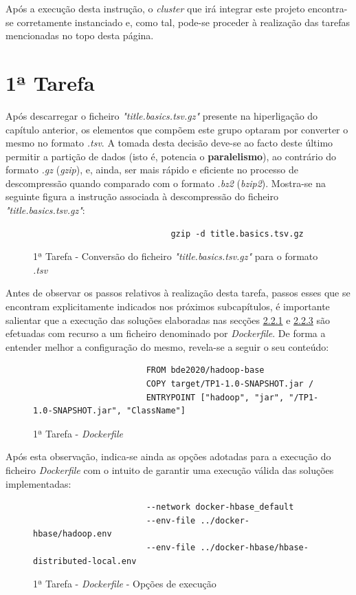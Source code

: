 \documentclass[a4paper]{report}
\begin{document}
{		Após a execução desta instrução, o \textit{cluster} que irá integrar este projeto encontra-se corretamente instanciado e, como tal, pode-se proceder à realização das tarefas mencionadas no topo desta página.
	
	\section{1ª Tarefa} \label{sec:Task1}
		Após descarregar o ficheiro \textit{"title.basics.tsv.gz"} presente na hiperligação do capítulo anterior, os elementos que compõem este grupo optaram por converter o mesmo no formato \textit{.tsv}. 
		A tomada desta decisão deve-se ao facto deste último permitir a partição de dados (isto é, potencia o \textbf{paralelismo}), ao contrário do formato \textit{.gz} (\textit{gzip}), e, ainda, ser mais rápido e eficiente no processo de descompressão quando comparado com o formato \textit{.bz2} (\textit{bzip2}).
		Mostra-se na seguinte figura a instrução associada à descompressão do ficheiro \textit{"title.basics.tsv.gz"}:
		\begin{figure}[H]
			{
				\color{teal}
				\begin{verbatim}
                            gzip -d title.basics.tsv.gz
				\end{verbatim}
			}
			\caption{1ª Tarefa - Conversão do ficheiro \textit{"title.basics.tsv.gz"} para o formato \textit{.tsv}}
            \label{fig:2}
		\end{figure}

		Antes de observar os passos relativos à realização desta tarefa, passos esses que se encontram explicitamente indicados nos próximos subcapítulos, é importante salientar que a execução das soluções elaboradas nas secções \hyperref[subsec:Task1-1]{2.2.1} e \hyperref[subsec:Task1-3]{2.2.3} são efetuadas com recurso a um ficheiro denominado por \textit{Dockerfile}.
		De forma a entender melhor a configuração do mesmo, revela-se a seguir o seu conteúdo:
		\begin{figure}[H]
			{
				\color{teal}
				\begin{verbatim}
					   FROM bde2020/hadoop-base
					   COPY target/TP1-1.0-SNAPSHOT.jar /
					   ENTRYPOINT ["hadoop", "jar", "/TP1-1.0-SNAPSHOT.jar", "ClassName"]
				\end{verbatim}
			}
            \caption{1ª Tarefa - \textit{Dockerfile}}
            \label{fig:3}
        \end{figure}
        
        Após esta observação, indica-se ainda as opções adotadas para a execução do ficheiro \textit{Dockerfile} com o intuito de garantir uma execução válida das soluções implementadas:
		\begin{figure}[H]
			{
				\color{teal}
				\begin{verbatim}
					   --network docker-hbase_default
					   --env-file ../docker-hbase/hadoop.env
					   --env-file ../docker-hbase/hbase-distributed-local.env
				\end{verbatim}
			}
			\caption{1ª Tarefa - \textit{Dockerfile} - Opções de execução}
			\label{fig:4}
        \end{figure}
		
}
\end{document}
